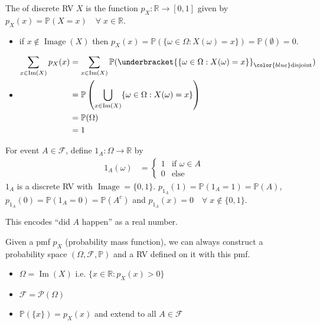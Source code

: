 \begin{definition}
    The  of discrete RV $X$ is the function $p_X : \mathbb{R} \to [0, 1]$ given by $p_X(x) = \mathbb{P}(X = x) \quad \forall \; x \in \mathbb{R}$.
\end{definition} 

\begin{note} \mbox{}
    \begin{itemize}
        \item if $x \notin \operatorname{Image}(X)$ then $p_X(x) = \mathbb{P}(\{\omega \in \Omega : X(\omega) = x\}) = \mathbb{P}(\emptyset) = 0$.
        \item \begin{align*}
            \sum_{x \in \operatorname{Im}(X)} p_X(x) &= \sum_{x \in \operatorname{Im}(X)} \mathbb{P}(\underbracket{\{\omega \in \Omega : X(\omega) = x\}}_{\color{blue} \text{disjoint}}) \\
            &= \mathbb{P}\left(\bigcup_{x \in \operatorname{Im}(X)} \{\omega \in \Omega : X(\omega) = x\} \right) \\
            &= \mathbb{P}(\Omega) \\
            &= 1
        \end{align*} 
    \end{itemize} 
\end{note} 
 
\begin{example}
    For event $A \in \mathcal{F}$, define $1_A : \Omega \to \mathbb{R}$ by 
    \begin{align*}
        1_A(\omega) &= \begin{cases}
            1 & \text{if } \omega \in A \\
            0 & \text{else }
        \end{cases}  
    \end{align*} 
    $1_A$ is a discrete RV with $\operatorname{Image} = \{0, 1\}$.
    $p_{1_A}(1) = \mathbb{P}(1_A = 1) = \mathbb{P}(A)$, $p_{1_A}(0) = \mathbb{P}(1_A = 0) = \mathbb{P}(A^c)$ and $p_{1_A}(x) = 0 \quad \forall \; x \notin \{0, 1\}$.

    \color{blue} This encodes ``did $A$ happen'' as a real number.
\end{example} 

\begin{remark}
    Given a pmf $p_X$ (probability mass function), we can always construct a probability space $(\Omega, \mathcal{F}, \mathbb{P})$ and a RV defined on it with this pmf.

    \color{blue}
    \begin{itemize}
        \item $\Omega = \operatorname{Im}(X)$ i.e. $\{x \in \mathbb{R} : p_X(x) > 0\}$
        \item $\mathcal{F} = \mathcal{P}(\Omega)$
        \item $\mathbb{P}(\{x\}) = p_X(x)$ and extend to all $A \in \mathcal{F}$
    \end{itemize} 
\end{remark} 

